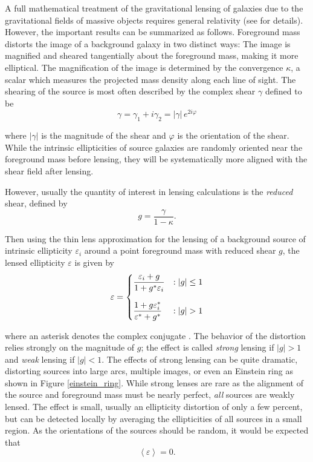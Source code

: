 \documentclass[%
 reprint,
 amsmath,amssymb,
 aps,nofootinbib
]{revtex4-1}
\begin{document}
A full mathematical treatment of the gravitational lensing of galaxies due to the gravitational fields of massive objects requires general relativity (see \cite{modern_cosmology} for details). However, the important results can be summarized as follows. Foreground mass distorts the image of a background galaxy in two distinct ways: The image is magnified and sheared tangentially about the foreground mass, making it more elliptical. The magnification of the image is determined by the convergence $\kappa$, a scalar which measures the projected mass density along each line of sight. The shearing of the source is most often described by the complex shear $\gamma$ defined to be
\begin{equation}\label{complex_shear}
\gamma=\gamma_1+i\gamma_2=|\gamma|\,e^{2i\varphi}
\end{equation}

\noindent where $|\gamma|$ is the magnitude of the shear and $\varphi$ is the orientation of the shear. While the intrinsic ellipticities of source galaxies are randomly oriented near the foreground mass before lensing, they will be systematically more aligned with the shear field after lensing.%

However, usually the quantity of interest in lensing calculations is the \textit{reduced} shear, defined by
\begin{equation}\label{reduced_shear}
g=\frac{\gamma}{1-\kappa}.
\end{equation}

\noindent Then using the thin lens approximation for the lensing of a background source of intrinsic ellipticity $\varepsilon_i$ around a point foreground mass with reduced shear $g$, the lensed ellipticity $\varepsilon$ is given by
\begin{equation}\label{lensing}
 \varepsilon = \begin{dcases} 
      \frac{\varepsilon_i+g}{1+g^*\varepsilon_i} & : |g|\leq1 \\[0.75em]
       \frac{1+g\varepsilon_i^*}{\varepsilon^*+g^*} & : |g|>1
   \end{dcases}
\end{equation}

\noindent where an asterisk denotes the complex conjugate \cite{schneider}. The behavior of the distortion relies strongly on the magnitude of $g$; the
effect is called \textit{strong} lensing if $|g|>1$ and \textit{weak} lensing if $|g|<1$. The effects of strong lensing can be quite dramatic, distorting sources into large arcs, multiple images, or even an Einstein ring as shown in Figure \ref{einstein_ring}. While strong lenses are rare as the alignment of the source and foreground mass must be nearly perfect, \textit{all} sources are weakly lensed. The effect is small, usually an ellipticity distortion of only a few percent, but can be detected locally by averaging the ellipticities of all sources in a small region. As the orientations of the sources should be random, it would be expected that
$$\left<\varepsilon\right>=0.$$
\end{document}
